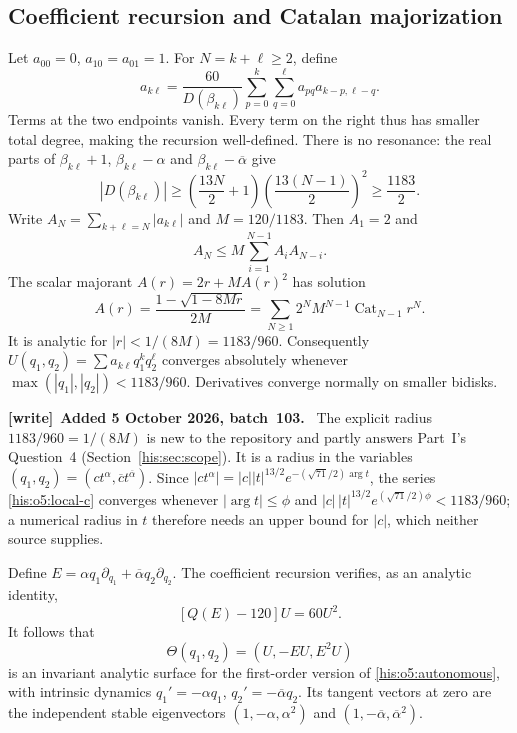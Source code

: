 \documentclass[11pt]{article}
\theoremstyle{remark}\newtheorem{remark}[theorem]{Remark}
\numberwithin{equation}{section}
\newenvironment{writenote}[1][]{\par\smallskip\begingroup\small
 \noindent\textbf{[write]}\if\relax\detokenize{#1}\relax\else~\textbf{#1.}\fi\ }%
 {\par\endgroup\smallskip}
\begin{document}
\subsection{Coefficient recursion and Catalan majorization}
Let $a_{00}=0$, $a_{10}=a_{01}=1$. For $N=k+\ell\ge2$, define
\begin{equation}\label{his:o5:acoef}
a_{k\ell}=\frac{60}{D(\beta_{k\ell})}
\sum_{p=0}^{k}\sum_{q=0}^{\ell}
 a_{pq}a_{k-p,\ell-q}.
\end{equation}
Terms at the two endpoints vanish. Every term on the right thus has
smaller total degree, making the recursion well-defined.
There is no resonance: the real parts of
$\beta_{k\ell}+1$, $\beta_{k\ell}-\alpha$ and
$\beta_{k\ell}-\overline\alpha$ give
\begin{equation}\label{his:o5:Dbound}
|D(\beta_{k\ell})|\ge
\left(\frac{13N}{2}+1\right)
\left(\frac{13(N-1)}2\right)^2\ge\frac{1183}{2}.
\end{equation}
Write $A_N=\sum_{k+\ell=N}|a_{k\ell}|$ and $M=120/1183$.
Then $A_1=2$ and
\[
A_N\le M\sum_{i=1}^{N-1}A_iA_{N-i}.
\]
The scalar majorant $A(r)=2r+MA(r)^2$ has solution
\[
A(r)=\frac{1-\sqrt{1-8Mr}}{2M}
=\sum_{N\ge1}2^NM^{N-1}\operatorname{Cat}_{N-1}r^N.
\]
It is analytic for $|r|<1/(8M)=1183/960$.
Consequently $U(q_1,q_2)=\sum a_{k\ell}q_1^kq_2^\ell$ converges absolutely
whenever $\max(|q_1|,|q_2|)<1183/960$. Derivatives converge normally on
smaller bidisks.
\begin{writenote}[Added 5 October 2026, batch~103]
The explicit radius $1183/960=1/(8M)$ is new to the repository and partly answers Part~I's Question~4 (Section~\ref{his:sec:scope}). It is a radius in the variables $(q_1,q_2)=(ct^\alpha,\overline ct^{\overline\alpha})$. Since $|ct^\alpha|=|c||t|^{13/2}e^{-(\sqrt{71}/2)\arg t}$, the series \eqref{his:o5:local-c} converges whenever $|\arg t|\le\phi$ and $|c|\,|t|^{13/2}e^{(\sqrt{71}/2)\phi}<1183/960$; a numerical radius in $t$ therefore needs an upper bound for $|c|$, which neither source supplies.
\end{writenote}


Define $E=\alpha q_1\partial_{q_1}+\overline\alpha q_2\partial_{q_2}$.
The coefficient recursion verifies, as an analytic identity,
\[
[Q(E)-120]U=60U^2.
\]
It follows that
\begin{equation}\label{his:o5:theta}
\Theta(q_1,q_2)=(U,-EU,E^2U)
\end{equation}
is an invariant analytic surface for the first-order version of
\eqref{his:o5:autonomous}, with intrinsic dynamics
$q_1'=-\alpha q_1$, $q_2'=-\overline\alpha q_2$.
Its tangent vectors at zero are the independent stable eigenvectors
$(1,-\alpha,\alpha^2)$ and $(1,-\overline\alpha,\overline\alpha^2)$.
\end{document}
